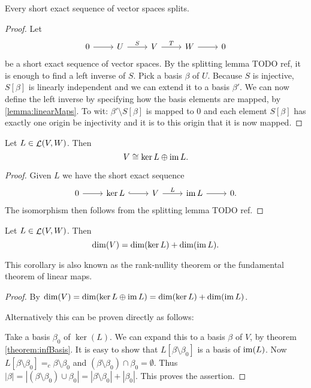 \begin{theorem}
Every short exact sequence of vector spaces splits.
\end{theorem}
\begin{proof}
Let
\[ \begin{tikzcd}
0 \rar & U \rar{S} & V \rar{T} & W \rar & 0
\end{tikzcd} \]
be a short exact sequence of vector spaces.
By the splitting lemma TODO ref, it is enough to find a left inverse of $S$. Pick a basis $\beta$ of $U$. Because $S$ is injective, $S[\beta]$ is linearly independent and we can extend it to a basis $\beta'$. We can now define the left inverse by specifying how the basis elements are mapped, by \ref{lemma:linearMaps}. To wit: $\beta'\setminus S[\beta]$ is mapped to $0$ and each element $S[\beta]$ has exactly one origin be injectivity and it is to this origin that it is now mapped.
\end{proof}
\begin{corollary} \label{corollary:directSumKernelImage}
Let $L \in \mathop{\mathcal{L}}(V,W)$. Then
\[ V \cong \ker L \oplus \operatorname{im} L. \]
\end{corollary}
\begin{proof}
Given $L$ we have the short exact sequence
\[ \begin{tikzcd}
0 \rar & \ker L \ar[r, hook] & V \rar{L} & \im L \rar & 0.
\end{tikzcd} \]
The isomorphism then follows from the splitting lemma TODO ref.
\end{proof}
\begin{corollary} \label{theorem:dimensionLinearMaps}
Let $L \in \mathop{\mathcal{L}}(V,W)$. Then
\[ \dim(V) = \dim(\ker L) + \dim(\operatorname{im} L). \]
\end{corollary}
This corollary is also known as the rank-nullity theorem or the fundamental theorem of linear maps.
\begin{proof}
By $\dim(V) = \dim(\ker L \oplus \operatorname{im} L) = \dim(\ker L) + \dim(\operatorname{im} L)$.

Alternatively this can be proven directly as follows:

Take a basis $\beta_0$ of $\ker(L)$. We can expand this to a basis $\beta$ of $V$, by theorem \ref{theorem:infBasis}. It is easy to show that $L[\beta\setminus \beta_0]$ is a basis of $\operatorname{im}(L)$. Now $L[\beta\setminus \beta_0] =_c \beta\setminus \beta_0$ and $(\beta\setminus \beta_0) \cap \beta_0 = \emptyset$. Thus $|\beta| = |(\beta\setminus \beta_0) \cup \beta_0| = |\beta\setminus \beta_0| + |\beta_0|$. This proves the assertion.
\end{proof}
